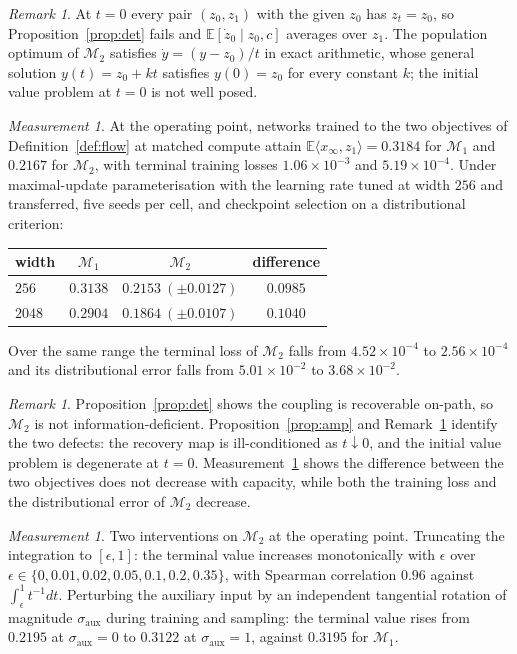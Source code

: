 \documentclass[11pt]{article}
\theoremstyle{definition}
\theoremstyle{remark}
\newtheorem{remark}[lemma]{Remark}
\newtheorem{measurement}[lemma]{Measurement}
\newcommand{\E}{\mathbb{E}}
\begin{document}
\begin{remark}\label{rem:origin}
At $t=0$ every pair $(z_0,z_1)$ with the given $z_0$ has $z_t=z_0$, so
Proposition~\ref{prop:det} fails and $\E[\dot z_0\mid z_0,c]$ averages over $z_1$. The population
optimum of $\mathcal M_2$ satisfies $\dot y=(y-z_0)/t$ in exact arithmetic, whose general solution
$y(t)=z_0+kt$ satisfies $y(0)=z_0$ for every constant $k$; the initial value problem at $t=0$ is
not well posed.
\end{remark}

\begin{measurement}\label{meas:m2}
At the operating point, networks trained to the two objectives of Definition~\ref{def:flow} at
matched compute attain $\E\langle x_\infty,z_1\rangle=0.3184$ for $\mathcal M_1$ and $0.2167$ for
$\mathcal M_2$, with terminal training losses $1.06\times10^{-3}$ and $5.19\times10^{-4}$. Under
maximal-update parameterisation with the learning rate tuned at width $256$ and transferred, five
seeds per cell, and checkpoint selection on a distributional criterion:
\begin{center}
\begin{tabular}{lccc}
\toprule
width & $\mathcal M_1$ & $\mathcal M_2$ & difference\\
\midrule
$256$  & $0.3138$ & $0.2153\ (\pm0.0127)$ & $0.0985$\\
$2048$ & $0.2904$ & $0.1864\ (\pm0.0107)$ & $0.1040$\\
\bottomrule
\end{tabular}
\end{center}
Over the same range the terminal loss of $\mathcal M_2$ falls from $4.52\times10^{-4}$ to
$2.56\times10^{-4}$ and its distributional error falls from $5.01\times10^{-2}$ to
$3.68\times10^{-2}$.
\end{measurement}

\begin{remark}\label{rem:claimstrength}
Proposition~\ref{prop:det} shows the coupling is recoverable on-path, so $\mathcal M_2$ is not
information-deficient. Proposition~\ref{prop:amp} and Remark~\ref{rem:origin} identify the two
defects: the recovery map is ill-conditioned as $t\downarrow0$, and the initial value problem is
degenerate at $t=0$. Measurement~\ref{meas:m2} shows the difference between the two objectives
does not decrease with capacity, while both the training loss and the distributional error of
$\mathcal M_2$ decrease.
\end{remark}

\begin{measurement}\label{meas:remedy}
Two interventions on $\mathcal M_2$ at the operating point. Truncating the integration to
$[\epsilon,1]$: the terminal value increases monotonically with $\epsilon$ over
$\epsilon\in\{0,0.01,0.02,0.05,0.1,0.2,0.35\}$, with Spearman correlation $0.96$ against
$\int_{\epsilon}^{1}t^{-1}dt$. Perturbing the auxiliary input by an independent tangential
rotation of magnitude $\sigma_{\mathrm{aux}}$ during training and sampling: the terminal value
rises from $0.2195$ at $\sigma_{\mathrm{aux}}=0$ to $0.3122$ at $\sigma_{\mathrm{aux}}=1$, against
$0.3195$ for $\mathcal M_1$.
\end{measurement}
\end{document}
